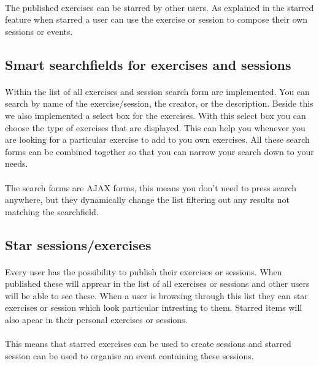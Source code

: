 \documentclass[11pt,a4paper]{scrartcl}
\begin{document}
\paragraph{}The published exercises can be starred by other users. As explained in the starred feature when starred a user can use the exercise or session to compose their  own sessions or events.
\subsection{Smart searchfields for exercises and sessions}
\paragraph{}Within the list of all exercises and session search form are implemented. You can search by name of the exercise/session, the creator, or the description. Beside this we also implemented a select box for the exercises. With this select box you can choose the type of exercises that are displayed. This can help you whenever you are looking for a particular exercise to add to you own exercises. All these search forms can be combined together so that you can narrow your search down to your needs.
\paragraph{}The search forms are AJAX forms, this means you don't need to press search anywhere, but they dynamically change the list filtering out any results not matching the searchfield.

\subsection{Star sessions/exercises}
\paragraph{}Every user has the possibility to publish their exercises or sessions. When published these will apprear in the list of all exercises or sessions and other users will be able to see these. When a user is browsing through this list they can star exercises or session which look particular intresting to them. Starred items will also apear in their personal exercises or sessions.
\paragraph{}This means that starred exercises can be used to create sessions and starred session can be used to organise an event containing these sessions.
\end{document}

